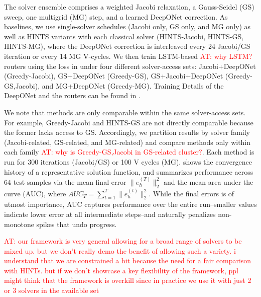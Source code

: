 \documentclass{article} %
\newcommand\ambuj[1]{\textcolor{red}{AT: #1}}
\begin{document}
The solver ensemble comprises a weighted Jacobi relaxation, a Gauss-Seidel (GS) sweep, one multigrid (MG) step, and a learned DeepONet correction. As baselines, we use single-solver schedules (Jacobi only, GS only, and MG only) as well as HINTS variants with each classical solver (HINTS-Jacobi, HINTS-GS, HINTS-MG), where the DeepONet correction is interleaved every 24 Jacobi/GS iteration or every 14 MG V-cycles. We then train LSTM-based \ambuj{why LSTM?} routers using the loss in  under four different solver-access sets: Jacobi+DeepONet (Greedy-Jacobi), GS+DeepONet (Greedy-GS), GS+Jacobi+DeepONet (Greedy-GS,Jacobi), and MG+DeepONet (Greedy-MG). Training Details of the DeepONet and the routers can be found in .

We note that methods are only comparable within the same solver-access sets. For example, Greedy-Jacobi and HINTS-GS are not directly comparable because the former lacks access to GS. Accordingly, we partition results by solver family (Jacobi-related, GS-related, and MG-related) and compare methods only within each family \ambuj{why is Greedy-GS,Jacobi in GS-related cluster?}. Each method is run for 300 iterations (Jacobi/GS) or 100 V cycles (MG).  shows the convergence history of a representative solution function, and  summarizes performance across $64$ test samples via the mean final error $\|e^{(T)}_h\|^2_2$ and the mean area under the curve (AUC), where $AUC_T = \sum_{t = 1}^T\|e^{(t)}_h\|^2_2$. While the final errors is of utmost importance, AUC captures performance over the entire run--smaller values indicate lower error at all intermediate steps--and naturally penalizes non-monotone spikes that undo progress. 

\ambuj{our framework is very general allowing for a broad range of solvers to be mixed up. but we don't really demo the benefit of allowing such a variety. i understand that we are constrained a bit because the need for a fair comparison with HINTs. but if we don't showcase a key flexibility of the framework, ppl might think that the framework is overkill since in practice we use it with just 2 or 3 solvers in the available set}
\end{document}
